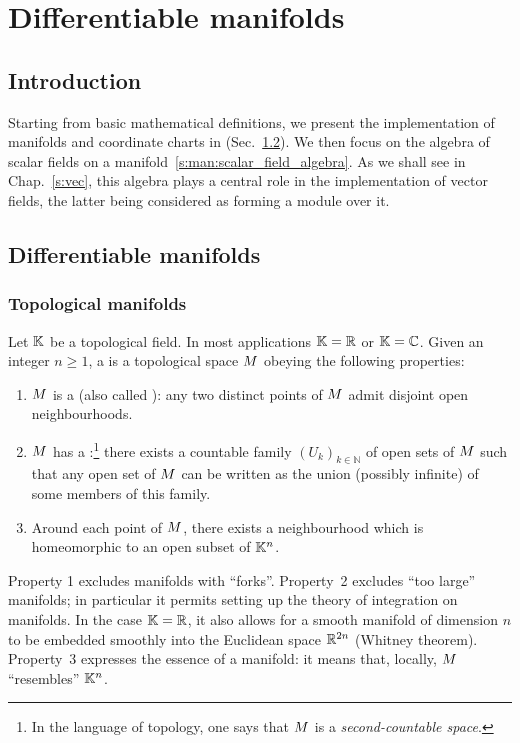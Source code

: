 \chapter{Differentiable manifolds} \label{s:man}

\minitoc

\section{Introduction}

Starting from basic mathematical definitions, we present
the implementation of manifolds and coordinate charts in \Sage{}
(Sec.~\ref{s:bas:manif}).
We then focus on the algebra of scalar fields on a manifold~\eqref{s:man:scalar_field_algebra}.
As we shall see in Chap.~\ref{s:vec}, this algebra plays a central role in the implementation of vector fields, the latter being considered as forming a module
over it.

\section{Differentiable manifolds} \label{s:bas:manif}

\subsection{Topological manifolds} \label{s:bas:def_manif}

Let $\mathbb{K}$ be a topological field. In most applications $\mathbb{K}=\mathbb{R}$ or $\mathbb{K}=\mathbb{C}$.
Given an integer $n\geq 1$, a  is a topological space $M$ obeying the following properties:
\begin{enumerate}
\item $M$ is a  (also called ): any two distinct points of $M$
admit disjoint open neighbourhoods.
\item $M$ has a :\footnote{In the language of topology, one says that $M$ is a \emph{second-countable space}.}
there exists a countable family
$(U_k)_{k\in\mathbb{N}}$ of open sets of $M$ such that any open set of $M$ can be written as the union (possibly infinite) of some members of this family.
\item Around each point of $M$, there exists a neighbourhood which is
homeomorphic to an open subset of $\mathbb{K}^n$.
\end{enumerate}
Property 1 excludes manifolds with ``forks''.
Property~2 excludes ``too large'' manifolds; in particular it permits setting
up the theory of integration on manifolds. In the case $\mathbb{K}=\mathbb{R}$, it also
allows for a smooth manifold of dimension $n$ to be embedded smoothly into the Euclidean space $\mathbb{R}^{2n}$
(Whitney theorem).
Property~3 expresses the essence of a manifold: it means that, locally,
$M$ ``resembles'' $\mathbb{K}^n$.

